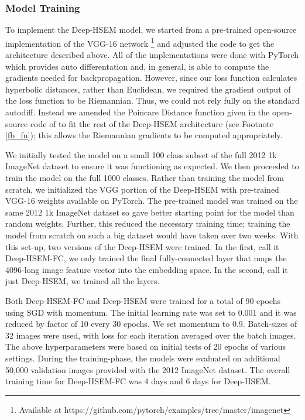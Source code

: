 \documentclass[12pt]{report}
\begin{document}
\subsubsection{Model Training}
To implement the Deep-HSEM model, we started from a pre-trained open-source implementation of the VGG-16 network \footnote{Available at https://github.com/pytorch/examples/tree/master/imagenet} and adjusted the code to get the architecture described above. All of the implementations were done with PyTorch \cite{Paszke2017} which provides auto differentation and, in general, is able to compute the gradients needed for backpropagation. However, since our loss function calculates hyperbolic distances, rather than Euclidean, we required the gradient output of the loss function to be Riemannian. Thus, we could not rely fully on the standard autodiff. Instead we amended the Poincare Distance function given in the open-source code of \cite{Nickel2017} to fit the rest of the Deep-HSEM architecture (see Footnote \ref{fb_fn}); this allows the Riemannian gradients to be computed appropriately.

We initially tested the model on a small 100 class subset of the full 2012 1k ImageNet dataset to ensure it was functioning as expected. We then proceeded to train the model on the full 1000 classes. Rather than training the model from scratch, we initialized the VGG portion of the Deep-HSEM with pre-trained VGG-16 weights available on PyTorch. The pre-trained model was trained on the same 2012 1k ImageNet dataset so gave better starting point for the model than random weights. Further, this reduced the necessary training time; training the model from scratch on such a big dataset would have taken over two weeks. With this set-up, two versions of the Deep-HSEM were trained. In the first, call it Deep-HSEM-FC, we only trained the final fully-connected layer that maps the 4096-long image feature vector into the embedding space. In the second, call it just Deep-HSEM, we trained all the layers.

Both Deep-HSEM-FC and Deep-HSEM were trained for a total of 90 epochs using SGD with momentum. The initial learning rate was set to 0.001 and it was reduced by factor of 10 every 30 epochs. We set momentum to 0.9. Batch-sizes of 32 images were used, with loss for each iteration averaged over the batch images. The above hyperparameters were based on initial tests of 20 epochs of various settings. During the training-phase, the models were evaluated on additional 50,000 validation images provided with the 2012 ImageNet dataset. The overall training time for Deep-HSEM-FC was 4 days and 6 days for Deep-HSEM.
\end{document}
